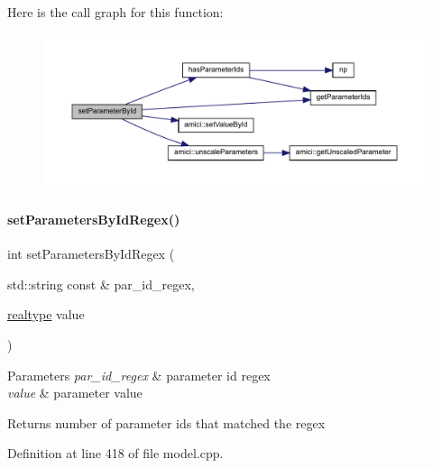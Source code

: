 Here is the call graph for this function\+:
\nopagebreak
\begin{figure}[H]
\begin{center}
\leavevmode
\includegraphics[width=350pt]{classamici_1_1_model_a995357a19663980279249d4b89a88f7a_cgraph}
\end{center}
\end{figure}
\mbox{\label{classamici_1_1_model_ab66d6b754637ed68449af96f5887a0be}} 
\paragraph{\texorpdfstring{set\+Parameters\+By\+Id\+Regex()}{setParametersByIdRegex()}}
{\footnotesize\ttfamily int set\+Parameters\+By\+Id\+Regex (\begin{DoxyParamCaption}\item[{std\+::string const \&}]{par\+\_\+id\+\_\+regex,  }\item[{\mbox{\hyperlink{namespaceamici_a1bdce28051d6a53868f7ccbf5f2c14a3}{realtype}}}]{value }\end{DoxyParamCaption})}


\begin{DoxyParams}{Parameters}
{\em par\+\_\+id\+\_\+regex} & parameter id regex \\
\hline
{\em value} & parameter value \\
\hline
\end{DoxyParams}
\begin{DoxyReturn}{Returns}
number of parameter ids that matched the regex 
\end{DoxyReturn}


Definition at line 418 of file model.\+cpp.


